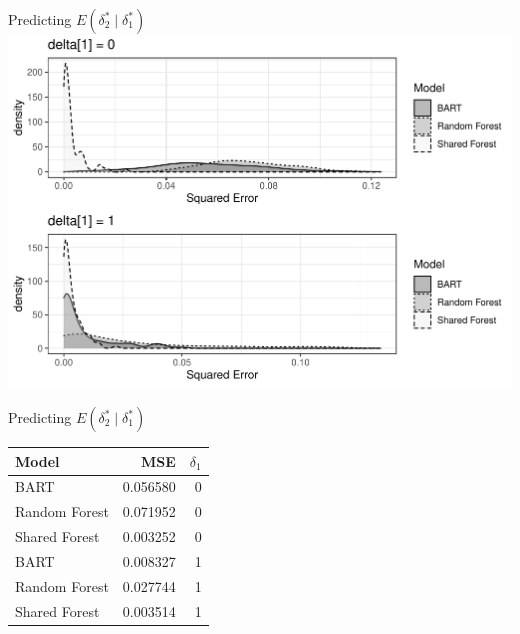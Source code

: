 \documentclass{beamer}
\begin{document}
\begin{frame}{Predicting $E(\delta_2^* \mid \delta_1^*)$ }
\includegraphics[width = .9\linewidth]{binary_sim_results.pdf}
\end{frame}

\begin{frame}{Predicting $E(\delta_2^* \mid \delta_1^*)$ }
\begin{table}[ht]
\centering
\begin{tabular}{lrr}
  \hline
Model & MSE & $\delta_1$ \\ 
  \hline
BART & 0.056580 & 0 \\ 
  Random Forest & 0.071952 & 0 \\ 
  Shared Forest & 0.003252 & 0 \\ \hline
  BART & 0.008327 & 1 \\ 
  Random Forest & 0.027744 & 1 \\ 
  Shared Forest & 0.003514 & 1 \\ 
   \hline
\end{tabular}
\end{table}
\end{frame}
\end{document}
